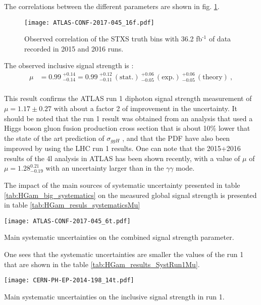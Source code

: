 The correlations between the different parameters are shown in fig. \ref{fig:org1ee6f2b}.

\begin{figure}[htbp]
\centering
\texttt{[image: ATLAS-CONF-2017-045\_16f.pdf]}
\caption{\label{fig:org1ee6f2b}
Observed correlation of the STXS truth bins with 36.2 fb\(^{\text{-1}}\) of data recorded in 2015 and 2016 runs.\cite{ATLAS-CONF-2017-045}}
\end{figure}


The observed inclusive signal strength is :
\begin{align*}
  \mu &= 0.99\ ^{+0.14}_{-0.14} = 0.99\ ^{+0.12}_{-0.11}\,\mathrm{(stat.)}\ ^{+0.06}_{-0.05}\,\mathrm{(exp.)}\ ^{+0.06}_{-0.05}\,\mathrm{(theory)} \ ,\\
\end{align*}

This result confirms the ATLAS run 1 diphoton signal strength measurement of $\mu = 1.17 \pm 0.27$ with about a factor 2 of improvement in the uncertainty.
It should be noted that the run 1 result was obtained from an analysis that used a Higgs boson gluon fusion production cross section \cite{CERN-2013-004} that is about 10\% lower that the state of the art prediction of $\sigma_{ggH}$ \cite{CERN-PH-TH-2015-055,CERN-TH-2016-006}, and that the PDF have also been improved by using the LHC run 1 results.
One can note that the 2015+2016 results of the 4l analysis in ATLAS \cite{ATLAS-CONF-2017-043} has been shown recently, with a value of $\mu$ of $\mu=1.28^{0.21}_{-0.19}$ with an uncertainty larger than in the $\gamma\gamma$ mode.

The impact of the main sources of systematic uncertainty presented in table \ref{tab:HGam_big_systematics} on the measured global signal strength is presented in table \ref{tab:HGam_resuls_systematicsMu}

\begin{table}
  \centering
  \texttt{[image: ATLAS-CONF-2017-045\_6t.pdf]}
  \caption{Main systematic uncertainties on the combined signal strength parameter.\cite{ATLAS-CONF-2017-045}}
  \label{tab:HGam_resuls_systematicsMu}
\end{table}

One sees that the systematic uncertainties are smaller the values of the run 1 \cite{CERN-PH-EP-2014-198} that are shown in the table \ref{tab:HGam_results_SystRun1Mu}.


\begin{table}
  \centering
  \texttt{[image: CERN-PH-EP-2014-198\_14t.pdf]}
  \caption{Main systematic uncertainties on the inclusive signal strength in run 1. \cite{CERN-PH-EP-2014-198}}
  \label{tab:HGam_results_SystRun1Mu}
\end{table}

